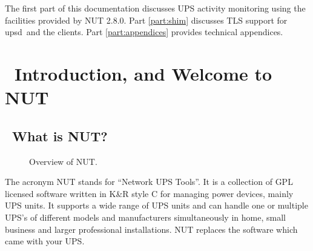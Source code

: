\documentclass[12pt]{article}
\newlength{\headersep}\setlength{\headersep}{3mm}
\newcommand{\Hsep}{\hspace{\headersep}}
\newcommand{\upsd}{\mbox{\textcolor{UPSDCOLOUR}{upsd}}}
\newcommand{\UPSmon}{\mbox{\textcolor{UPSMONCOLOUR}{UPSmon.py}}}
\newcommand{\Vsoft}{2.8.0}
\begin{document}
The first part of this documentation discusses UPS activity monitoring
using the facilities provided by NUT \Vsoft.  Part \ref{part:shim}
discusses TLS support for \upsd\ and the clients.
Part \ref{part:appendices} provides technical appendices.

\vspace{7mm}
\section{\Hsep\ Introduction, and Welcome to NUT}\label{section:intro}




\subsection{\Hsep\ What is NUT?}\label{whatisNUT}

\begin{figure}[ht]
\begin{center}
\end{center}
\vspace{-6mm}
\caption{Overview of NUT.\label{fig:overview-OL}}
\end{figure}

The acronym NUT stands for ``Network UPS Tools''.  It is a collection of GPL
licensed software written in K\&R style C for managing power devices, mainly
UPS units.  It supports a wide range of UPS units and can handle one or
multiple UPS's of different models and manufacturers simultaneously in home,
small business and larger professional installations.  NUT replaces the
software which came with your UPS.
\end{document}
